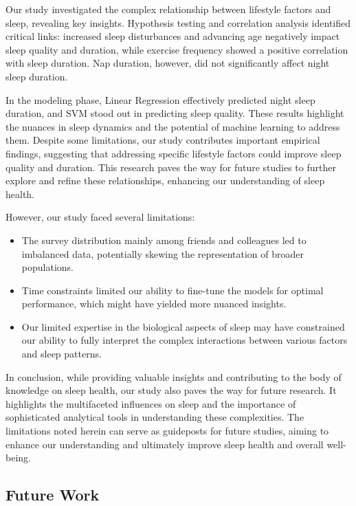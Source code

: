 \documentclass[conference]{IEEEtran}
\begin{document}
Our study investigated the complex relationship between lifestyle factors and sleep, revealing key insights. Hypothesis testing and correlation analysis identified critical links: increased sleep disturbances and advancing age negatively impact sleep quality and duration, while exercise frequency showed a positive correlation with sleep duration. Nap duration, however, did not significantly affect night sleep duration.

In the modeling phase, Linear Regression effectively predicted night sleep duration, and SVM stood out in predicting sleep quality. These results highlight the nuances in sleep dynamics and the potential of machine learning to address them. Despite some limitations, our study contributes important empirical findings, suggesting that addressing specific lifestyle factors could improve sleep quality and duration. This research paves the way for future studies to further explore and refine these relationships, enhancing our understanding of sleep health.


However, our study faced several limitations:
\begin{itemize}
    \item The survey distribution mainly among friends and colleagues led to imbalanced data, potentially skewing the representation of broader populations.
    \item Time constraints limited our ability to fine-tune the models for optimal performance, which might have yielded more nuanced insights.
    \item Our limited expertise in the biological aspects of sleep may have constrained our ability to fully interpret the complex interactions between various factors and sleep patterns.
\end{itemize}

In conclusion, while providing valuable insights and contributing to the body of knowledge on sleep health, our study also paves the way for future research. It highlights the multifaceted influences on sleep and the importance of sophisticated analytical tools in understanding these complexities. The limitations noted herein can serve as guideposts for future studies, aiming to enhance our understanding and ultimately improve sleep health and overall well-being.


\subsection*{Future Work}
\end{document}
